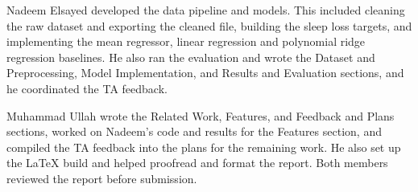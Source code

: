 \documentclass[11pt]{article}
\begin{document}
Nadeem Elsayed developed the data pipeline and models. This included cleaning the raw dataset and exporting the cleaned file, building the sleep loss targets, and implementing the mean regressor, linear regression and polynomial ridge regression baselines. He also ran the evaluation and wrote the Dataset and Preprocessing, Model Implementation, and Results and Evaluation sections, and he coordinated the TA feedback.

Muhammad Ullah wrote the Related Work, Features, and Feedback and Plans sections, worked on Nadeem’s code and results for the Features section, and compiled the TA feedback into the plans for the remaining work. He also set up the LaTeX build and helped proofread and format the report. Both members reviewed the report before submission.


\end{document}
